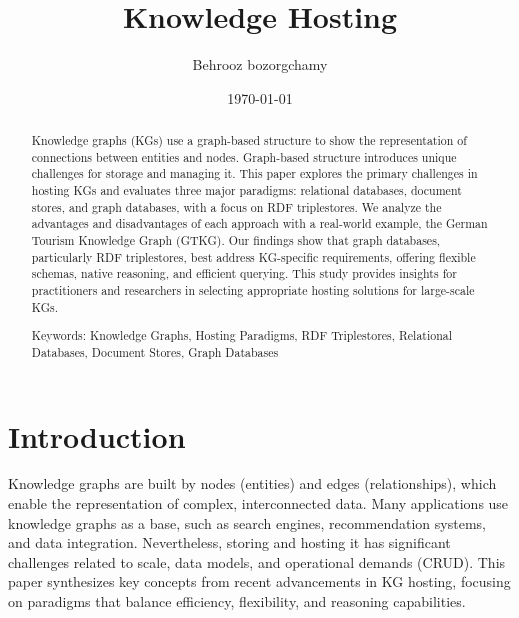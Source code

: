 \documentclass[12pt]{article}
\begin{document}
\title{Knowledge Hosting}
\author{Behrooz bozorgchamy}
\date{\today}
\maketitle{}
\begin{abstract}
    Knowledge graphs (KGs) use a graph-based structure to show the representation of connections between entities and nodes. Graph-based structure introduces unique challenges for storage and managing it. This paper explores the primary challenges in hosting KGs and evaluates three major paradigms: relational databases, document stores, and graph databases, with a focus on RDF triplestores. We analyze the advantages and disadvantages of each approach with a real-world example, the German Tourism Knowledge Graph (GTKG). Our findings show that graph databases, particularly RDF triplestores, best address KG-specific requirements, offering flexible schemas, native reasoning, and efficient querying. This study provides insights for practitioners and researchers in selecting appropriate hosting solutions for large-scale KGs.

    Keywords: Knowledge Graphs, Hosting Paradigms, RDF Triplestores, Relational Databases, Document Stores, Graph Databases
\end{abstract}

\section{Introduction}
Knowledge graphs are built by nodes (entities) and edges (relationships), which enable the representation of complex, interconnected data. Many applications use knowledge graphs as a base, such as search engines, recommendation systems, and data integration. Nevertheless, storing and hosting it has significant challenges related to scale, data models, and operational demands (CRUD). This paper synthesizes key concepts from recent advancements in KG hosting, focusing on paradigms that balance efficiency, flexibility, and reasoning capabilities.
\end{document}
